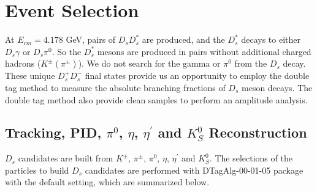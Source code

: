 \section{Event Selection}
\label{ST-selection}
At $E_{cm} = 4.178$ GeV, pairs of $D_{s}D_{s}^{*}$ are produced,  and the $D_{s}^{*}$ decays to either $D_{s}\gamma$ or $D_{s}\pi^{0}$.
So the $D_{s}^{*}$ mesons are produced in pairs without additional charged hadrons ($K^{\pm}(\pi^{\pm})$).
We do not search for the gamma or $\pi^{0}$ from the $D_{s}$ decay. 
These unique $D_{s}^{+}D_{s}^{-}$ final states provide us an opportunity to employ the double tag method to measure the absolute branching fractions of $D_{s}$ meson decays.
The double tag method also provide clean samples to perform an amplitude analysis.


\subsection{Tracking, PID, $\pi^{0}$, $\eta$, $\eta^{'}$ and $K_{S}^{0}$ Reconstruction }
$D_{s}$ candidates are built from $K^{\pm}$, $\pi^{\pm}$, $\pi^{0}$, $\eta$, $\eta^{'}$ and $K_{S}^{0}$. The selections of the particles to build $D_{s}$ candidates are performed with DTagAlg-00-01-05 package with the default setting, which are summarized below.

